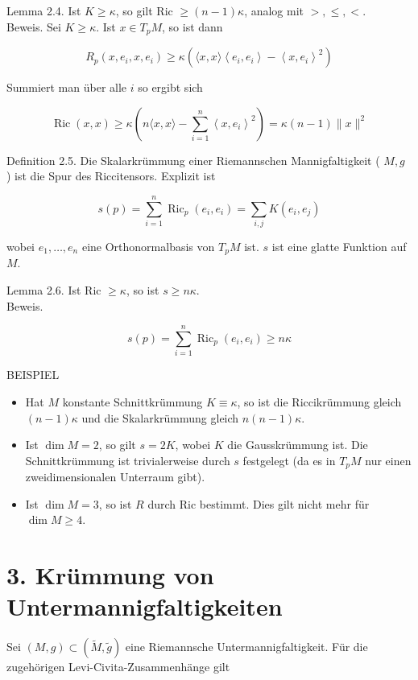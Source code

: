 \documentclass[10pt, letterpaper]{article}
\begin{document}
Lemma 2.4. Ist $K \geq \kappa$, so gilt Ric $\geq(n-1) \kappa$, analog mit $>, \leq,<$.\\
Beweis. Sei $K \geq \kappa$. Ist $x \in T_{p} M$, so ist dann

$$
R_{p}\left(x, e_{i}, x, e_{i}\right) \geq \kappa\left(\langle x, x\rangle\left\langle e_{i}, e_{i}\right\rangle-\left\langle x, e_{i}\right\rangle^{2}\right)
$$

Summiert man über alle $i$ so ergibt sich

$$
\operatorname{Ric}(x, x) \geq \kappa\left(n\langle x, x\rangle-\sum_{i=1}^{n}\left\langle x, e_{i}\right\rangle^{2}\right)=\kappa(n-1)\|x\|^{2}
$$

Definition 2.5. Die Skalarkrümmung einer Riemannschen Mannigfaltigkeit ( $M, g$ ) ist die Spur des Riccitensors. Explizit ist

$$
s(p)=\sum_{i=1}^{n} \operatorname{Ric}_{p}\left(e_{i}, e_{i}\right)=\sum_{i, j} K\left(e_{i}, e_{j}\right)
$$

wobei $e_{1}, \ldots, e_{n}$ eine Orthonormalbasis von $T_{p} M$ ist. $s$ ist eine glatte Funktion auf $M$.

Lemma 2.6. Ist Ric $\geq \kappa$, so ist $s \geq n \kappa$.\\
Beweis.

$$
s(p)=\sum_{i=1}^{n} \operatorname{Ric}_{p}\left(e_{i}, e_{i}\right) \geq n \kappa
$$

BEISPIEL

\begin{itemize}
  \item Hat $M$ konstante Schnittkrümmung $K \equiv \kappa$, so ist die Riccikrümmung gleich $(n-1) \kappa$ und die Skalarkrümmung gleich $n(n-1) \kappa$.
  \item Ist $\operatorname{dim} M=2$, so gilt $s=2 K$, wobei $K$ die Gausskrümmung ist. Die Schnittkrümmung ist trivialerweise durch $s$ festgelegt (da es in $T_{p} M$ nur einen zweidimensionalen Unterraum gibt).
  \item Ist $\operatorname{dim} M=3$, so ist $R$ durch Ric bestimmt. Dies gilt nicht mehr für $\operatorname{dim} M \geq 4$.
\end{itemize}

\section*{3. Krümmung von Untermannigfaltigkeiten}
Sei $(M, g) \subset(\tilde{M}, \tilde{g})$ eine Riemannsche Untermannigfaltigkeit. Für die zugehörigen Levi-Civita-Zusammenhänge gilt
\end{document}
